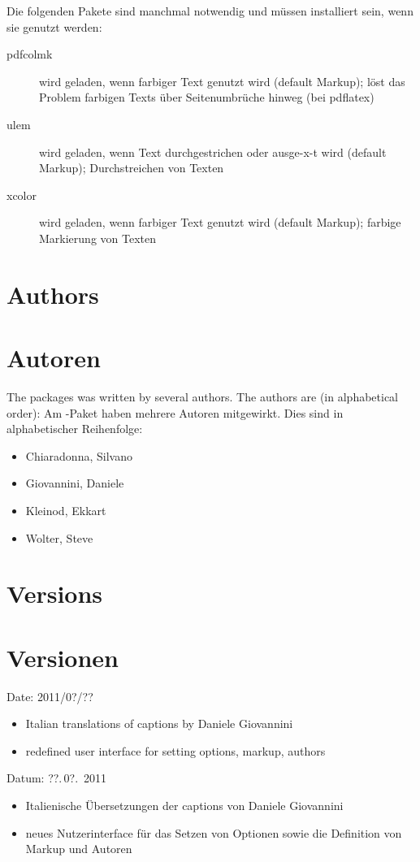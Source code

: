 		Die folgenden Pakete sind manchmal notwendig und müssen installiert sein, wenn sie genutzt werden:
		\begin{description}
			\item [pdfcolmk] wird geladen, wenn farbiger Text genutzt wird (default Markup); löst das Problem farbigen Texts über Seitenumbrüche hinweg (bei pdflatex)
			\item [ulem] wird geladen, wenn Text durchgestrichen oder ausge-x-t wird (default Markup); Durchstreichen von Texten
			\item [xcolor] wird geladen, wenn farbiger Text genutzt wird (default Markup); farbige Markierung von Texten
		\end{description}
	\fi

\ifENGLISH
	\section{Authors}
\fi
	\ifGERMAN
		\section{Autoren}
	\fi
\label{sec:authors}

\ifENGLISH
	The  packages was written by several authors.
	The authors are (in alphabetical order):
\fi
	\ifGERMAN
		Am -Paket haben mehrere Autoren mitgewirkt.
		Dies sind in alphabetischer Reihenfolge:
	\fi
\begin{itemize}
	\item Chiaradonna, Silvano
	\item Giovannini, Daniele
	\item Kleinod, Ekkart
	\item Wolter, Steve
\end{itemize}

\ifENGLISH
	\section{Versions}
\fi
	\ifGERMAN
		\section{Versionen}
	\fi
\label{sec:versions}


\ifENGLISH
	Date: 2011/0?/??
	\begin{itemize}
		\item Italian translations of captions by Daniele Giovannini
		\item redefined user interface for setting options, markup, authors
	\end{itemize}
\fi
	\ifGERMAN
		Datum: ??.\,0?.~2011
		\begin{itemize}
			\item Italienische Übersetzungen der captions von Daniele Giovannini
			\item neues Nutzerinterface für das Setzen von Optionen sowie die Definition von Markup und Autoren
		\end{itemize}
	\fi

